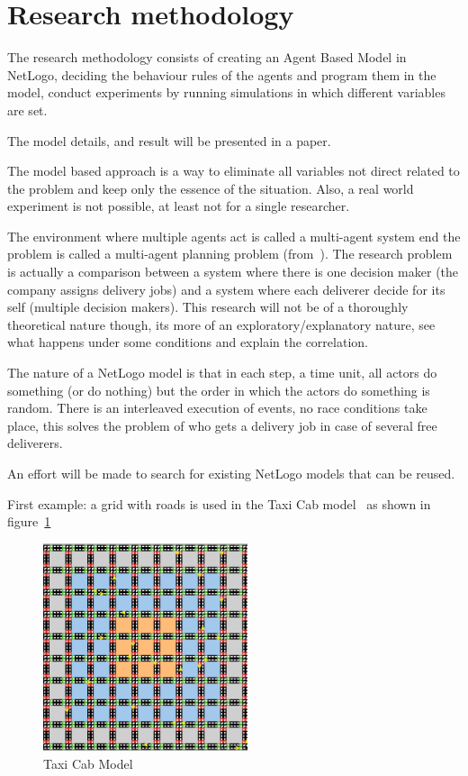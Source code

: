 \section{Research methodology}
The research methodology consists of creating an Agent Based Model in NetLogo, deciding the behaviour rules of the agents and program them in the model, conduct
experiments by running simulations in which different variables are set.

The model details, and result will be presented in a paper.

The model based approach is a way to eliminate all variables not direct related to the problem and keep only the essence of the situation.
Also, a real world experiment is not possible, at least not for a single researcher.

The environment where multiple agents act is called a multi-agent system end the problem is called a multi-agent planning problem (from~\cite{russell2016artificial}).
The research problem is actually a comparison between a system where there is one decision maker (the company assigns delivery jobs) and a system where each deliverer decide for its self (multiple decision makers).
This research will not be of a thoroughly theoretical nature though, its more of an exploratory/explanatory nature, see what happens under some conditions and explain the correlation.

The nature of a NetLogo model is that in each step, a time unit, all actors do something (or do nothing) but the order in which the actors do something is random.
There is an interleaved execution of events, no race conditions take place, this solves the problem of who gets a delivery job in case of several free deliverers.

An effort will be made to search for existing NetLogo models that can be reused.

First example: a grid with roads is used in the Taxi Cab model~\cite{dongpingtaxicabs2019} as shown in figure~\ref{fig:taxi cab}
\begin{figure}
    \centering
    \includegraphics[width=6cm]{sections/pics/Taxi Cabs}
    \caption{Taxi Cab Model}
    \label{fig:taxi cab}
\end{figure}

